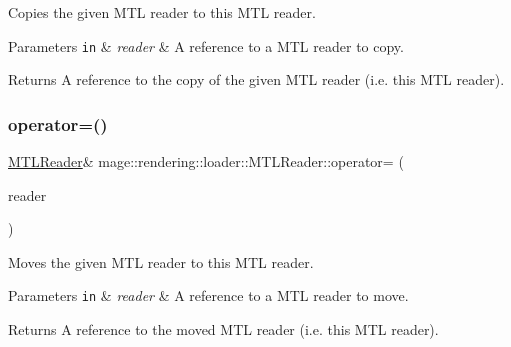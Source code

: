 Copies the given M\+TL reader to this M\+TL reader.


\begin{DoxyParams}[1]{Parameters}
\mbox{\tt in}  & {\em reader} & A reference to a M\+TL reader to copy. \\
\hline
\end{DoxyParams}
\begin{DoxyReturn}{Returns}
A reference to the copy of the given M\+TL reader (i.\+e. this M\+TL reader). 
\end{DoxyReturn}
\mbox{\label{classmage_1_1rendering_1_1loader_1_1_m_t_l_reader_a057f38f1f720e040b2ab5fa08f42fac4}} 
\subsubsection{\texorpdfstring{operator=()}{operator=()}\hspace{0.1cm}{\footnotesize\ttfamily [2/2]}}
{\footnotesize\ttfamily \mbox{\hyperlink{classmage_1_1rendering_1_1loader_1_1_m_t_l_reader}{M\+T\+L\+Reader}}\& mage\+::rendering\+::loader\+::\+M\+T\+L\+Reader\+::operator= (\begin{DoxyParamCaption}\item[{\mbox{\hyperlink{classmage_1_1rendering_1_1loader_1_1_m_t_l_reader}{M\+T\+L\+Reader}} \&\&}]{reader }\end{DoxyParamCaption})\hspace{0.3cm}{\ttfamily [delete]}}

Moves the given M\+TL reader to this M\+TL reader.


\begin{DoxyParams}[1]{Parameters}
\mbox{\tt in}  & {\em reader} & A reference to a M\+TL reader to move. \\
\hline
\end{DoxyParams}
\begin{DoxyReturn}{Returns}
A reference to the moved M\+TL reader (i.\+e. this M\+TL reader). 
\end{DoxyReturn}
\mbox{\label{classmage_1_1rendering_1_1loader_1_1_m_t_l_reader_a6ee0c53351656ac4cd92db1d7c372cff}} 

